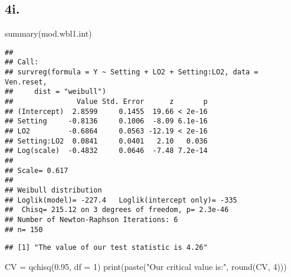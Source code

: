 \documentclass[
]{article}
\newenvironment{Shaded}{\begin{snugshade}}{\end{snugshade}}
\newcommand{\AttributeTok}[1]{\textcolor[rgb]{0.77,0.63,0.00}{#1}}
\newcommand{\CommentTok}[1]{\textcolor[rgb]{0.56,0.35,0.01}{\textit{#1}}}
\newcommand{\DecValTok}[1]{\textcolor[rgb]{0.00,0.00,0.81}{#1}}
\newcommand{\FloatTok}[1]{\textcolor[rgb]{0.00,0.00,0.81}{#1}}
\newcommand{\FunctionTok}[1]{\textcolor[rgb]{0.00,0.00,0.00}{#1}}
\newcommand{\NormalTok}[1]{#1}
\newcommand{\OtherTok}[1]{\textcolor[rgb]{0.56,0.35,0.01}{#1}}
\newcommand{\SpecialCharTok}[1]{\textcolor[rgb]{0.00,0.00,0.00}{#1}}
\newcommand{\StringTok}[1]{\textcolor[rgb]{0.31,0.60,0.02}{#1}}
\begin{document}
\hypertarget{i.-1}{%
\subsection{4i.}\label{i.-1}}

\begin{Shaded}
\begin{Highlighting}[]
\FunctionTok{summary}\NormalTok{(mod.wbl1.int)}
\end{Highlighting}
\end{Shaded}

\begin{verbatim}
## 
## Call:
## survreg(formula = Y ~ Setting + LO2 + Setting:LO2, data = Ven.reset, 
##     dist = "weibull")
##               Value Std. Error      z       p
## (Intercept)  2.8599     0.1455  19.66 < 2e-16
## Setting     -0.8136     0.1006  -8.09 6.1e-16
## LO2         -0.6864     0.0563 -12.19 < 2e-16
## Setting:LO2  0.0841     0.0401   2.10   0.036
## Log(scale)  -0.4832     0.0646  -7.48 7.2e-14
## 
## Scale= 0.617 
## 
## Weibull distribution
## Loglik(model)= -227.4   Loglik(intercept only)= -335
##  Chisq= 215.12 on 3 degrees of freedom, p= 2.3e-46 
## Number of Newton-Raphson Iterations: 6 
## n= 150
\end{verbatim}

\begin{Shaded}
\end{Shaded}

\begin{verbatim}
## [1] "The value of our test statistic is 4.26"
\end{verbatim}

\begin{Shaded}
\begin{Highlighting}[]
\NormalTok{CV }\OtherTok{=} \FunctionTok{qchisq}\NormalTok{(}\FloatTok{0.95}\NormalTok{, }\AttributeTok{df =} \DecValTok{1}\NormalTok{)}
\FunctionTok{print}\NormalTok{(}\FunctionTok{paste}\NormalTok{(}\StringTok{"Our critical value is:"}\NormalTok{, }\FunctionTok{round}\NormalTok{(CV, }\DecValTok{4}\NormalTok{)))}
\end{Highlighting}
\end{Shaded}
\end{document}
